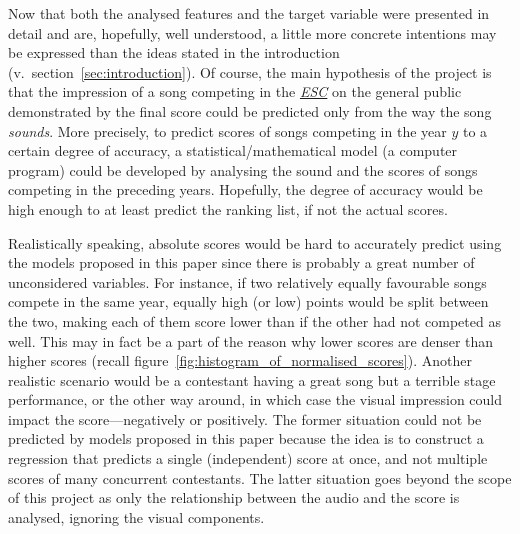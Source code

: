 \documentclass[conference, a4paper, 12pt]{IEEEtran}
\begin{document}
    Now that both the analysed features and the target variable were presented in detail and are, hopefully, well understood, a little more concrete intentions may be expressed than the ideas stated in the introduction (v.\ section~\ref{sec:introduction}). Of course, the main hypothesis of the project is that the impression of a song competing in the \href{http://eurovision.tv/}{\emph{ESC}} on the general public demonstrated by the final score could be predicted only from the way the song \emph{sounds}. More precisely, to predict scores of songs competing in the year $ y $ to a certain degree of accuracy, a statistical/mathematical model (a computer program) could be developed by analysing the sound and the scores of songs competing in the preceding years. Hopefully, the degree of accuracy would be high enough to at least predict the ranking list, if not the actual scores.

    \par

    Realistically speaking, absolute scores would be hard to accurately predict using the models proposed in this paper since there is probably a great number of unconsidered variables. For instance, if two relatively equally favourable songs compete in the same year, equally high (or low) points would be split between the two, making each of them score lower than if the other had not competed as well. This may in fact be a part of the reason why lower scores are denser than higher scores (recall figure~\ref{fig:histogram_of_normalised_scores}). Another realistic scenario would be a contestant having a great song but a terrible stage performance, or the other way around, in which case the visual impression could impact the score---negatively or positively. The former situation could not be predicted by models proposed in this paper because the idea is to construct a regression that predicts a single (independent) score at once, and not multiple scores of many concurrent contestants. The latter situation goes beyond the scope of this project as only the relationship between the audio and the score is analysed, ignoring the visual components.

    \par
\end{document}

